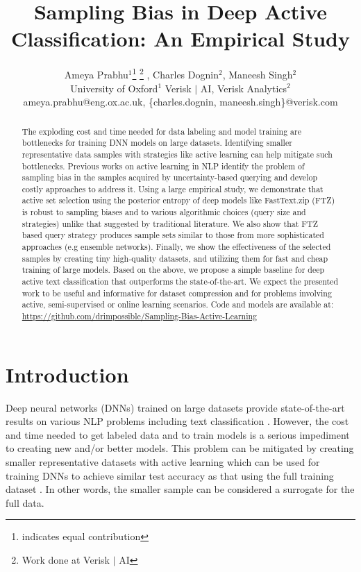 \documentclass[11pt,a4paper]{article}
\title{Sampling Bias in Deep Active Classification: An Empirical Study}
\author{Ameya Prabhu$^1$\thanks{ \hspace{0.1cm} indicates equal contribution}  \hspace{0.05cm}\thanks{ \hspace{0.1cm} Work done at Verisk $\vert$ AI}  , Charles Dognin$^2$\footnotemark[1] , Maneesh Singh$^2$ \\
University of Oxford$^1$ \qquad Verisk $\vert$ AI, Verisk Analytics$^2$ \\
ameya.prabhu@eng.ox.ac.uk, \{charles.dognin, maneesh.singh\}@verisk.com\\}
\begin{document}
\maketitle
\begin{abstract}
The exploding cost and time needed for data labeling and model training are bottlenecks for training DNN models on large datasets. Identifying smaller representative data samples with strategies like active learning can help mitigate such bottlenecks. Previous works on active learning in NLP identify the problem of sampling bias in the samples acquired by uncertainty-based querying and develop costly approaches to address it. Using a large empirical study, we demonstrate that active set selection using the posterior entropy of deep models like FastText.zip (FTZ) is robust to sampling biases and to various algorithmic choices (query size and strategies) unlike that suggested by traditional literature. We also show that FTZ based query strategy produces sample sets similar to those from more sophisticated approaches (e.g ensemble networks). Finally, we show the effectiveness of the selected samples by creating tiny high-quality datasets, and utilizing them for fast and cheap training of large models. Based on the above, we propose a simple baseline for deep active text classification that outperforms the state-of-the-art. We expect the presented work to be useful and informative for dataset compression and for problems involving active, semi-supervised or online learning scenarios. Code and models are available at: \href{https://github.com/drimpossible/Sampling-Bias-Active-Learning}{https://github.com/drimpossible/Sampling-Bias-Active-Learning}


\end{abstract} \section{Introduction}
\label{sec:introduction}


Deep neural networks (DNNs) trained on large datasets provide state-of-the-art results on various NLP problems \cite{devlin2018bert} including text classification \cite{howard2018universal}. However, the cost and time needed to get labeled data and to train models is a serious impediment to creating new and/or better models. This problem can be mitigated by creating smaller representative datasets with active learning which can be used for training DNNs to achieve similar test accuracy as that using the full training dataset . In other words, the smaller sample can be considered a surrogate for the full data. 
\end{document}
